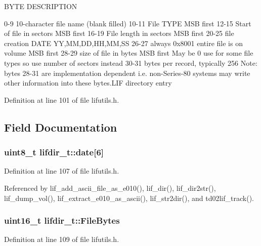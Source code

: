 B\+Y\+TE D\+E\+S\+C\+R\+I\+P\+T\+I\+ON 

 0-\/9 10-\/character file name (blank filled) 10-\/11 File T\+Y\+PE M\+SB first 12-\/15 Start of file in sectors M\+SB first 16-\/19 File length in sectors M\+SB first 20-\/25 file creation D\+A\+TE YY,MM,DD,HH,MM,SS 26-\/27 always 0x8001 entire file is on volume M\+SB first 28-\/29 size of file in bytes M\+SB first May be 0 use for some file types so use number of sectors instead 30-\/31 bytes per record, typically 256 Note\+: bytes 28-\/31 are implementation dependent i.\+e. non-\/\+Series-\/80 systems may write other information into these bytes.\+L\+IF directory entry 

Definition at line 101 of file lifutils.\+h.



\subsection{Field Documentation}
\subsubsection[{\texorpdfstring{date}{date}}]{\setlength{\rightskip}{0pt plus 5cm}uint8\+\_\+t lifdir\+\_\+t\+::date\mbox{[}6\mbox{]}}\hypertarget{structlifdir__t_afb6d03670642d3bf86f460ae246ceb0b}{}\label{structlifdir__t_afb6d03670642d3bf86f460ae246ceb0b}


Definition at line 107 of file lifutils.\+h.



Referenced by lif\+\_\+add\+\_\+ascii\+\_\+file\+\_\+as\+\_\+e010(), lif\+\_\+dir(), lif\+\_\+dir2str(), lif\+\_\+dump\+\_\+vol(), lif\+\_\+extract\+\_\+e010\+\_\+as\+\_\+ascii(), lif\+\_\+str2dir(), and td02lif\+\_\+track().

\subsubsection[{\texorpdfstring{File\+Bytes}{FileBytes}}]{\setlength{\rightskip}{0pt plus 5cm}uint16\+\_\+t lifdir\+\_\+t\+::\+File\+Bytes}\hypertarget{structlifdir__t_a6e2414bf7966358862b59c5eaf3903f2}{}\label{structlifdir__t_a6e2414bf7966358862b59c5eaf3903f2}


Definition at line 109 of file lifutils.\+h.



